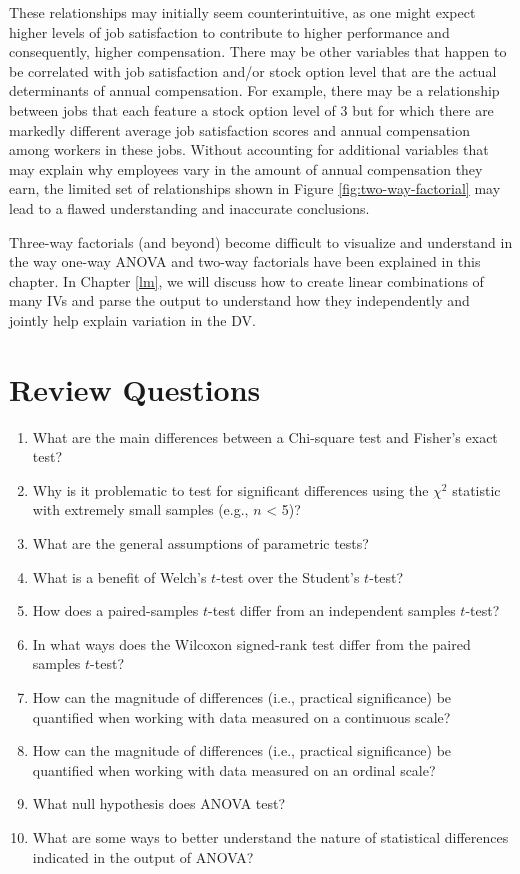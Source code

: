 \documentclass[
]{book}
\begin{document}
These relationships may initially seem counterintuitive, as one might expect higher levels of job satisfaction to contribute to higher performance and consequently, higher compensation. There may be other variables that happen to be correlated with job satisfaction and/or stock option level that are the actual determinants of annual compensation. For example, there may be a relationship between jobs that each feature a stock option level of 3 but for which there are markedly different average job satisfaction scores and annual compensation among workers in these jobs. Without accounting for additional variables that may explain why employees vary in the amount of annual compensation they earn, the limited set of relationships shown in Figure \ref{fig:two-way-factorial} may lead to a flawed understanding and inaccurate conclusions.

Three-way factorials (and beyond) become difficult to visualize and understand in the way one-way ANOVA and two-way factorials have been explained in this chapter. In Chapter \ref{lm}, we will discuss how to create linear combinations of many IVs and parse the output to understand how they independently and jointly help explain variation in the DV.

\hypertarget{review-questions-7}{%
\section{Review Questions}\label{review-questions-7}}

\begin{enumerate}
\def\labelenumi{\arabic{enumi}.}
\item
  What are the main differences between a Chi-square test and Fisher's exact test?
\item
  Why is it problematic to test for significant differences using the \({\chi}^2\) statistic with extremely small samples (e.g., \(n\) \textless{} 5)?
\item
  What are the general assumptions of parametric tests?
\item
  What is a benefit of Welch's \(t\)-test over the Student's \(t\)-test?
\item
  How does a paired-samples \(t\)-test differ from an independent samples \(t\)-test?
\item
  In what ways does the Wilcoxon signed-rank test differ from the paired samples \(t\)-test?
\item
  How can the magnitude of differences (i.e., practical significance) be quantified when working with data measured on a continuous scale?
\item
  How can the magnitude of differences (i.e., practical significance) be quantified when working with data measured on an ordinal scale?
\item
  What null hypothesis does ANOVA test?
\item
  What are some ways to better understand the nature of statistical differences indicated in the output of ANOVA?
\end{enumerate}
\end{document}
